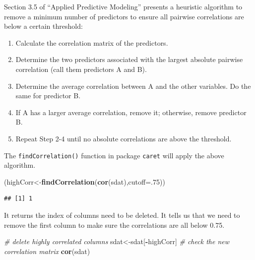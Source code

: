 \documentclass[12pt,]{krantz}
\newenvironment{Shaded}{\begin{snugshade}}{\end{snugshade}}
\newcommand{\KeywordTok}[1]{\textcolor[rgb]{0.13,0.29,0.53}{\textbf{#1}}}
\newcommand{\DataTypeTok}[1]{\textcolor[rgb]{0.13,0.29,0.53}{#1}}
\newcommand{\DecValTok}[1]{\textcolor[rgb]{0.00,0.00,0.81}{#1}}
\newcommand{\CommentTok}[1]{\textcolor[rgb]{0.56,0.35,0.01}{\textit{#1}}}
\newcommand{\OperatorTok}[1]{\textcolor[rgb]{0.81,0.36,0.00}{\textbf{#1}}}
\newcommand{\NormalTok}[1]{#1}
\providecommand{\tightlist}{%
  \setlength{\itemsep}{0pt}\setlength{\parskip}{0pt}}
\renewenvironment{quote}{\begin{VF}}{\end{VF}}
\theoremstyle{definition}
\theoremstyle{definition}
\theoremstyle{definition}
\theoremstyle{remark}
\begin{document}
Section 3.5 of ``Applied Predictive Modeling'' \citep{APM} presents a
heuristic algorithm to remove a minimum number of predictors to ensure
all pairwise correlations are below a certain threshold:

\begin{quote}
\begin{enumerate}
\def\labelenumi{(\arabic{enumi})}
\tightlist
\item
  Calculate the correlation matrix of the predictors.
\item
  Determine the two predictors associated with the largest absolute
  pairwise correlation (call them predictors A and B).
\item
  Determine the average correlation between A and the other variables.
  Do the same for predictor B.
\item
  If A has a larger average correlation, remove it; otherwise, remove
  predictor B.
\item
  Repeat Step 2-4 until no absolute correlations are above the
  threshold.
\end{enumerate}
\end{quote}

The \texttt{findCorrelation()} function in package \texttt{caret} will
apply the above algorithm.

\begin{Shaded}
\begin{Highlighting}[]
\NormalTok{(highCorr<-}\KeywordTok{findCorrelation}\NormalTok{(}\KeywordTok{cor}\NormalTok{(sdat),}\DataTypeTok{cutoff=}\NormalTok{.}\DecValTok{75}\NormalTok{))}
\end{Highlighting}
\end{Shaded}

\begin{verbatim}
## [1] 1
\end{verbatim}

It returns the index of columns need to be deleted. It tells us that we
need to remove the first column to make sure the correlations are all
below 0.75.

\begin{Shaded}
\begin{Highlighting}[]
\CommentTok{# delete highly correlated columns}
\NormalTok{sdat<-sdat[}\OperatorTok{-}\NormalTok{highCorr]}
\CommentTok{# check the new correlation matrix}
\KeywordTok{cor}\NormalTok{(sdat)}
\end{Highlighting}
\end{Shaded}
\end{document}
